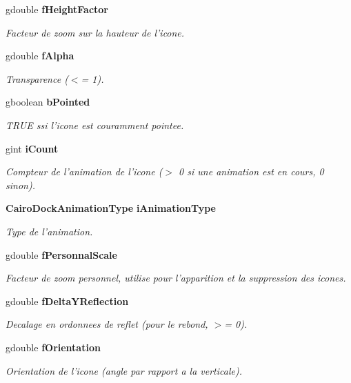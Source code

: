 \begin{CompactItemize}
gdouble {\bf fHeightFactor}
\begin{CompactList}\small\item\em Facteur de zoom sur la hauteur de l'icone. \item\end{CompactList}\item 
gdouble {\bf fAlpha}
\begin{CompactList}\small\item\em Transparence ($<$= 1). \item\end{CompactList}\item 
gboolean {\bf bPointed}
\begin{CompactList}\small\item\em TRUE ssi l'icone est couramment pointee. \item\end{CompactList}\item 
gint {\bf iCount}
\begin{CompactList}\small\item\em Compteur de l'animation de l'icone ($>$ 0 si une animation est en cours, 0 sinon). \item\end{CompactList}\item 
{\bf CairoDockAnimationType} {\bf iAnimationType}
\begin{CompactList}\small\item\em Type de l'animation. \item\end{CompactList}\item 
gdouble {\bf fPersonnalScale}
\begin{CompactList}\small\item\em Facteur de zoom personnel, utilise pour l'apparition et la suppression des icones. \item\end{CompactList}\item 
gdouble {\bf fDeltaYReflection}
\begin{CompactList}\small\item\em Decalage en ordonnees de reflet (pour le rebond, $>$= 0). \item\end{CompactList}\item 
gdouble {\bf fOrientation}
\begin{CompactList}\small\item\em Orientation de l'icone (angle par rapport a la verticale). \item\end{CompactList}\item 

\end{CompactItemize}
